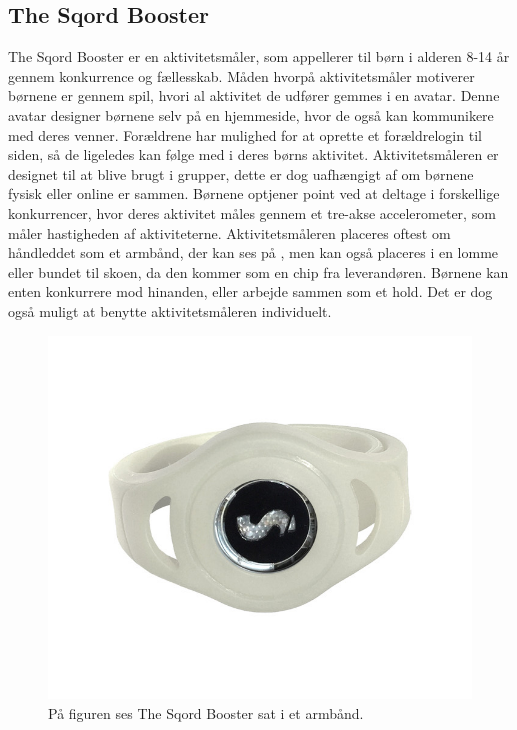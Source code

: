 \subsection{The Sqord Booster}
The Sqord Booster er en aktivitetsmåler, som appellerer til børn i alderen 8-14 år gennem konkurrence og fællesskab. Måden hvorpå aktivitetsmåler motiverer børnene er gennem spil, hvori al aktivitet de udfører gemmes i en avatar. Denne avatar designer børnene selv på en hjemmeside, hvor de også kan kommunikere med deres venner. Forældrene har mulighed for at oprette et forældrelogin til siden, så de ligeledes kan følge med i deres børns aktivitet. Aktivitetsmåleren er designet til at blive brugt i grupper, dette er dog uafhængigt af om børnene fysisk eller online er sammen. \citep{Sqord_family2015} \newline
Børnene optjener point ved at deltage i forskellige konkurrencer, hvor deres aktivitet måles gennem et tre-akse accelerometer, som måler hastigheden af aktiviteterne. Aktivitetsmåleren placeres oftest om håndleddet som et armbånd, der kan ses på , men kan også placeres i en lomme eller bundet til skoen, da den kommer som en chip fra leverandøren. \citep{Sqord_family2015} \newline Børnene kan enten konkurrere mod hinanden, eller arbejde sammen som et hold. Det er dog også muligt at benytte aktivitetsmåleren individuelt. \citep{Sqord_family2015,Sqord_group2015}
\begin{figure}[H]
	\centering
	\includegraphics[scale=0.9]{figures/aProblemanalyse/sqord.JPG}
	\caption{På figuren ses The Sqord Booster sat i et armbånd. \citep{Sqord2016}}
	\label{fig:sqord}
\end{figure}
